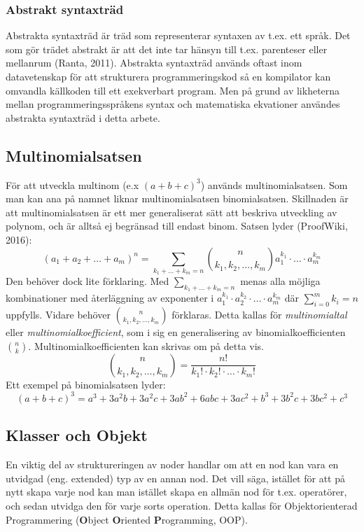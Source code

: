 \documentclass[12pt,a4paper]{article}
\begin{document}
\subsubsection{Abstrakt syntaxträd}
Abstrakta syntaxträd är träd som representerar syntaxen av t.ex. ett språk. Det som gör trädet abstrakt är att det inte tar hänsyn till t.ex. parenteser eller mellanrum (Ranta, 2011). Abstrakta syntaxträd används oftast inom datavetenskap för att strukturera programmeringskod så en kompilator kan omvandla källkoden till ett exekverbart program. Men på grund av likheterna mellan programmeringsspråkens syntax och matematiska ekvationer användes abstrakta syntaxträd i detta arbete.
\subsection{Multinomialsatsen}
För att utveckla multinom (e.x \((a+b+c)^3\))  används multinomialsatsen. Som man kan ana på namnet liknar multinomialsatsen binomialsatsen. Skillnaden är att multinomialsatsen är ett mer generaliserat sätt att beskriva utveckling av polynom, och är alltså ej begränsad till endast binom. Satsen lyder (ProofWiki, 2016):
\[(a_{1}+a_{2}+\ldots+a_{m})^{n}=\displaystyle\sum_{k_{1}+\dots+k_{m}=n}\binom{n}{k_{1},k_{2},\dots,k_{m}}a_{1}^{k_{1}}\cdot\ldots\cdot a_{m}^{k_{m}}\]
Den behöver dock lite förklaring. Med \(\displaystyle\sum_{k_{1}+\dots+k_{m}=n}\) menas alla möjliga kombinationer med återläggning av exponenter i \(a_{1}^{k_{1}}\cdot a_{2}^{k_{2}}\cdot\ldots\cdot a_{m}^{k_{m}}\) där \(\displaystyle\sum_{i=0}^{m}k_{i}=n\) uppfylls. Vidare behöver  \(\binom{n}{k_{1},k_{2},\ldots,k_{m}}\) förklaras. Detta kallas för \textit{multinomialtal} eller \textit{multinomialkoefficient}, som i sig en generalisering av binomialkoefficienten \(\binom{n}{k}\). Multinomialkoefficienten kan skrivas om på detta vis.
\[\binom{n}{k_{1},k_{2},\ldots,k_{m}}=\frac{n!}{k_{1}!\cdot k_{2}!\cdot\ldots\cdot k_{m}!}\]
Ett exempel på binomialsatsen lyder:
\[(a + b + c)^{3}=a^3+3a^2b+3a^2c+3ab^2+6abc+3ac^2+b^3+3b^2c+3bc^2+c^3\]
\newpage
\subsection{Klasser och Objekt}
\label{subsection:klasserochobjekt}
En viktig del av struktureringen av noder handlar om att en nod kan vara en utvidgad (eng. extended) typ av en annan nod. Det vill säga, istället för att på nytt skapa varje nod kan man istället skapa en allmän nod för t.ex. operatörer, och sedan utvidga den för varje sorts operation. Detta kallas för Objektorienterad Programmering (\textbf{O}bject \textbf{O}riented \textbf{P}rogramming, OOP). 
\end{document}
